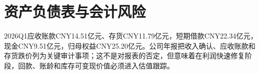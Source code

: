 \section{资产负债表与会计风险}
2026Q1应收账款CNY14.51亿元、存货CNY11.79亿元，短期借款CNY22.34亿元，现金CNY9.51亿元，归母权益CNY25.20亿元。公司年报把收入确认、应收账款和存货跌价列为关键审计事项；这不是对报表的否定，但意味着在利润快速修复阶段，回款、账龄和库存可变现价值必须进入估值跟踪。

